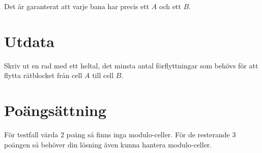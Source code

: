 Det är garanterat att varje bana har precis ett $A$ och ett $B$.

\section*{Utdata}

Skriv ut en rad med ett heltal, det minsta antal förflyttningar som behövs för att flytta rätblocket från cell $A$ till cell $B$.

\section*{Poängsättning}

För testfall värda $2$ poäng så finns inga modulo-celler.
För de resterande $3$ poängen så behöver din lösning även kunna hantera modulo-celler.
